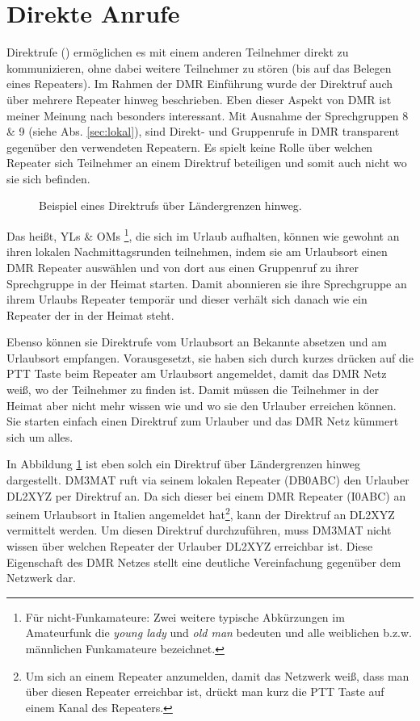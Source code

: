 \section{Direkte Anrufe} \label{sec:privatecall}
Direktrufe () ermöglichen es mit einem anderen Teilnehmer direkt zu kommunizieren, ohne dabei weitere Teilnehmer zu stören (bis auf das Belegen eines Repeaters). Im Rahmen der DMR Einführung wurde der Direktruf auch über mehrere Repeater hinweg beschrieben. Eben dieser Aspekt von DMR ist meiner Meinung nach besonders interessant. Mit Ausnahme der Sprechgruppen 8 \& 9 (siehe Abs. \ref{sec:lokal}), sind Direkt- und Gruppenrufe in DMR transparent gegenüber den verwendeten Repeatern. Es spielt keine Rolle über welchen Repeater sich Teilnehmer an einem Direktruf beteiligen und somit auch nicht wo sie sich befinden. 

\begin{figure}[!ht]
 \centering
 
 \caption{Beispiel eines Direktrufs über Ländergrenzen hinweg.} \label{fig:pc}
\end{figure}

Das heißt, YLs \& OMs \footnote{Für nicht-Funkamateure: Zwei weitere typische Abkürzungen im Amateurfunk die \emph{young lady} und \emph{old man} bedeuten und alle weiblichen b.z.w. männlichen Funkamateure bezeichnet.}, die sich im Urlaub aufhalten, können wie gewohnt an ihren lokalen Nachmittagsrunden teilnehmen, indem sie am Urlaubsort einen DMR Repeater auswählen und von dort aus einen Gruppenruf zu ihrer Sprechgruppe in der Heimat starten. Damit abonnieren sie ihre Sprechgruppe an ihrem Urlaubs Repeater temporär und dieser verhält sich danach wie ein Repeater der in der Heimat steht. 

Ebenso können sie Direktrufe vom Urlaubsort an Bekannte absetzen und am Urlaubsort empfangen. Vorausgesetzt, sie haben sich durch kurzes drücken auf die PTT Taste beim Repeater am Urlaubsort angemeldet, damit das DMR Netz weiß, wo der Teilnehmer zu finden ist. Damit müssen die Teilnehmer in der Heimat aber nicht mehr wissen wie und wo sie den Urlauber erreichen können. Sie starten einfach einen Direktruf zum Urlauber und das DMR Netz kümmert sich um alles.

In Abbildung \ref{fig:pc} ist eben solch ein Direktruf über Ländergrenzen hinweg dargestellt. DM3MAT ruft via seinem lokalen Repeater (DB0ABC) den Urlauber DL2XYZ per Direktruf an. Da sich dieser bei einem DMR Repeater (I0ABC) an seinem Urlaubsort in Italien angemeldet hat\footnote{Um sich an einem Repeater anzumelden, damit das Netzwerk weiß, dass man über diesen Repeater erreichbar ist, drückt man kurz die PTT Taste auf einem Kanal des Repeaters.}, kann der Direktruf an DL2XYZ vermittelt werden. Um diesen Direktruf durchzuführen, muss DM3MAT nicht wissen über welchen Repeater der Urlauber DL2XYZ erreichbar ist. Diese Eigenschaft des DMR Netzes stellt eine deutliche Vereinfachung gegenüber dem  Netzwerk dar. 